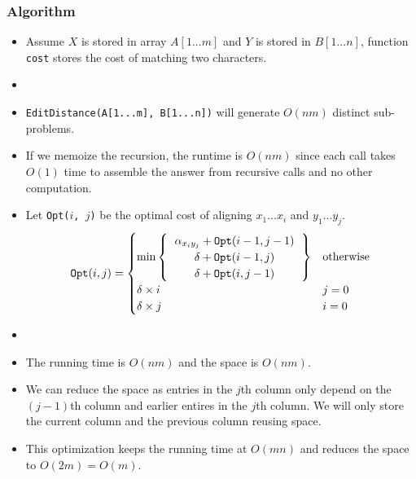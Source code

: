 \subsubsection{Algorithm}
\begin{itemize}
    \item Assume $X$ is stored in array $A[1...m]$ and $Y$ is stored in $B[1...n]$, function \texttt{cost} stores the cost of matching two characters.
    \item[] 
    \item \texttt{EditDistance(A[1...m], B[1...n])} will generate $O(nm)$ distinct sub-problems.
    \item If we memoize the recursion, the runtime is $O(nm)$ since each call takes $O(1)$ time to assemble the answer from recursive calls and no other computation.
    \item Let \texttt{Opt($i$, $j$)} be the optimal cost of aligning $x_1...x_i$ and $y_1...y_j$.
    \begin{equation}
        \texttt{Opt}(i, j) = \begin{cases}
            \min \left\{
                \begin{tabular}{c}
                    $\alpha_{x_iy_j} + \texttt{Opt}(i - 1, j - 1)$ \\
                    $\delta + \texttt{Opt}(i - 1, j)$ \\
                    $\delta + \texttt{Opt}(i, j - 1)$ \\
                \end{tabular}
            \right\} & \text{otherwise} \\
            \delta \times i & j = 0 \\
            \delta \times j & i = 0 \\
        \end{cases}
    \end{equation}
    \item[] 
    \item The running time is $O(nm)$ and the space is $O(nm)$.
    \item We can reduce the space as entries in the $j$th column only depend on the $(j - 1)$th column and earlier entires in the $j$th column. We will only store the current column and the previous column reusing space.
    \item This optimization keeps the running time at $O(mn)$ and reduces the space to $O(2m) = O(m)$.
\end{itemize}
